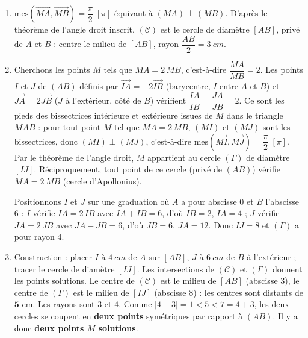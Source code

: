 \documentclass[11pt]{article}
\begin{document}
\begin{corrige}
\begin{enumerate}
\item $\mathrm{mes}(\overrightarrow{MA}, \overrightarrow{MB}) = \dfrac{\pi}{2} \; [\pi]$ équivaut à $(MA) \perp (MB)$. D'après le théorème de l'angle droit inscrit, $(\mathcal{C})$ est le cercle de diamètre $[AB]$, privé de $A$ et $B$ : centre le milieu de $[AB]$, rayon $\dfrac{AB}{2} = \SI{3}{cm}$.
\item Cherchons les points $M$ tels que $MA = 2\,MB$, c'est-à-dire $\dfrac{MA}{MB} = 2$. Les points $I$ et $J$ de $(AB)$ définis par $\overrightarrow{IA} = -2\overrightarrow{IB}$ (barycentre, $I$ entre $A$ et $B$) et $\overrightarrow{JA} = 2\overrightarrow{JB}$ ($J$ à l'extérieur, côté de $B$) vérifient $\dfrac{IA}{IB} = \dfrac{JA}{JB} = 2$. Ce sont les pieds des bissectrices intérieure et extérieure issues de $M$ dans le triangle $MAB$ : pour tout point $M$ tel que $MA = 2\,MB$, $(MI)$ et $(MJ)$ sont les bissectrices, donc $(MI) \perp (MJ)$, c'est-à-dire $\mathrm{mes}(\overrightarrow{MI}, \overrightarrow{MJ}) = \dfrac{\pi}{2}\;[\pi]$. Par le théorème de l'angle droit, $M$ appartient au cercle $(\Gamma)$ de diamètre $[IJ]$. Réciproquement, tout point de ce cercle (privé de $(AB)$) vérifie $MA = 2\,MB$ (cercle d'Apollonius).

Positionnons $I$ et $J$ sur une graduation où $A$ a pour abscisse $0$ et $B$ l'abscisse $6$ : $I$ vérifie $IA = 2\,IB$ avec $IA + IB = 6$, d'où $IB = 2$, $IA = 4$ ; $J$ vérifie $JA = 2\,JB$ avec $JA - JB = 6$, d'où $JB = 6$, $JA = 12$. Donc $IJ = 8$ et $(\Gamma)$ a pour rayon $4$.
\item Construction : placer $I$ à $\SI{4}{cm}$ de $A$ sur $[AB]$, $J$ à $\SI{6}{cm}$ de $B$ à l'extérieur ; tracer le cercle de diamètre $[IJ]$. Les intersections de $(\mathcal{C})$ et $(\Gamma)$ donnent les points solutions. Le centre de $(\mathcal{C})$ est le milieu de $[AB]$ (abscisse $3$), le centre de $(\Gamma)$ est le milieu de $[IJ]$ (abscisse $8$) : les centres sont distants de $\mathbf{5}$ cm. Les rayons sont $3$ et $4$. Comme $|4-3| = 1 < 5 < 7 = 4+3$, les deux cercles se coupent en \textbf{deux points} symétriques par rapport à $(AB)$. Il y a donc \textbf{deux points $M$ solutions}.
\end{enumerate}
\end{corrige}
\end{document}
